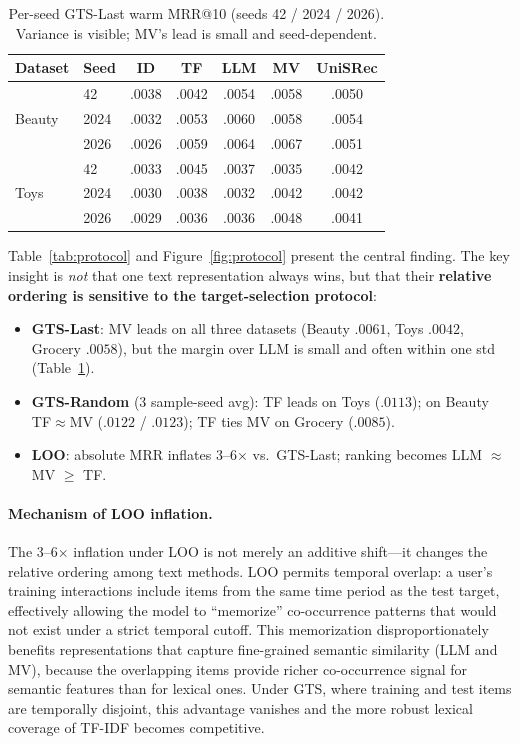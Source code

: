 \documentclass[sigconf,natbib=true,anonymous]{acmart}
\newcommand{\tfidf}{\textsc{TF-IDF}\xspace}
\begin{document}
\begin{table}[t]
\centering
\caption{%
Per-seed GTS-Last warm MRR@10 (seeds 42 / 2024 / 2026).
Variance is visible; MV's lead is small and seed-dependent.%
}
\label{tab:perseed}
\small
\setlength{\tabcolsep}{3.5pt}
\begin{tabular}{@{}llccccc@{}}
\toprule
Dataset & Seed & ID & TF & LLM & MV & UniSRec \\
\midrule
\multirow{3}{*}{Beauty}
 & 42    & .0038 & .0042 & .0054 & .0058 & .0050 \\
 & 2024  & .0032 & .0053 & .0060 & .0058 & .0054 \\
 & 2026  & .0026 & .0059 & .0064 & .0067 & .0051 \\
\midrule
\multirow{3}{*}{Toys}
 & 42    & .0033 & .0045 & .0037 & .0035 & .0042 \\
 & 2024  & .0030 & .0038 & .0032 & .0042 & .0042 \\
 & 2026  & .0029 & .0036 & .0036 & .0048 & .0041 \\
\bottomrule
\end{tabular}
\end{table}

Table~\ref{tab:protocol} and Figure~\ref{fig:protocol} present the central finding.
The key insight is \emph{not} that one text representation always wins, but that their \textbf{relative ordering is sensitive to the target-selection protocol}:

\begin{itemize}[leftmargin=*,itemsep=1pt]
\item \textbf{GTS-Last}: MV leads on all three datasets (Beauty $.0061$, Toys $.0042$, Grocery $.0058$), but the margin over LLM is small and often within one std (Table~\ref{tab:perseed}).
\item \textbf{GTS-Random} (3 sample-seed avg): TF leads on Toys ($.0113$); on Beauty TF$\approx$MV ($.0122$ / $.0123$); TF ties MV on Grocery ($.0085$).
\item \textbf{LOO}: absolute MRR inflates 3--6$\times$ vs.\ GTS-Last; ranking becomes LLM $\approx$ MV $\ge$ TF.
\end{itemize}

\paragraph{Mechanism of LOO inflation.}
The 3--6$\times$ inflation under LOO is not merely an additive shift---it changes the relative ordering among text methods.
LOO permits temporal overlap: a user's training interactions include items from the same time period as the test target, effectively allowing the model to ``memorize'' co-occurrence patterns that would not exist under a strict temporal cutoff.
This memorization disproportionately benefits representations that capture fine-grained semantic similarity (LLM and MV), because the overlapping items provide richer co-occurrence signal for semantic features than for lexical ones.
Under GTS, where training and test items are temporally disjoint, this advantage vanishes and the more robust lexical coverage of \tfidf becomes competitive.
\end{document}
